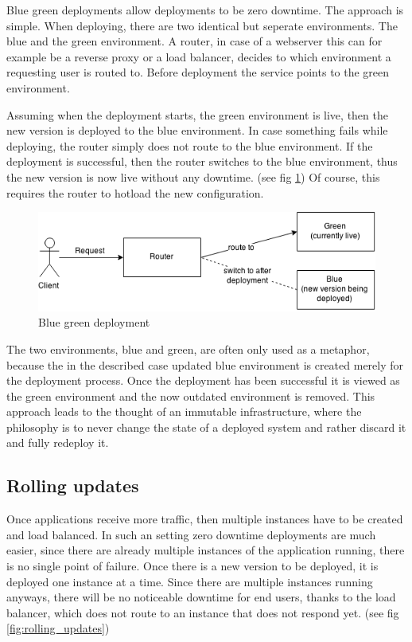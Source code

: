 Blue green deployments allow deployments to be zero downtime. The approach is
simple. When deploying, there are two identical but seperate environments. The
blue and the green environment. A router, in case of a webserver this can for
example be a reverse proxy or a load balancer, decides to which environment a
requesting user is routed to. Before deployment the service points to the green
environment.

Assuming when the deployment starts, the green environment is live, then the
new version is deployed to the blue environment. In case something fails while
deploying, the router simply does not route to the blue environment. If the
deployment is successful, then the router switches to the blue environment,
thus the new version is now live without any downtime. (see fig
\ref{fig:blue_green_deployment}) Of course, this requires the router to hotload the
new configuration.

\begin{figure}
  \includegraphics[scale=0.55]{pictures/blue_green_deployment.png}
  \caption{Blue green deployment}
  \centering
  \label{fig:blue_green_deployment}
\end{figure}

The two environments, blue and green, are often only used as a metaphor,
because the in the described case updated blue environment is created merely
for the deployment process. Once the deployment has been successful it is
viewed as the green environment and the now outdated environment is removed.
This approach leads to the thought of an immutable infrastructure, where the
philosophy is to never change the state of a deployed system and rather discard
it and fully redeploy it.

\subsection{Rolling updates}

Once applications receive more traffic, then multiple instances have to be
created and load balanced. In such an setting zero downtime deployments are
much easier, since there are already multiple instances of the application
running, there is no single point of failure. Once there is a new version to be
deployed, it is deployed one instance at a time. Since there are multiple
instances running anyways, there will be no noticeable downtime for end users,
thanks to the load balancer, which does not route to an instance that does not
respond yet. (see fig \ref{fig:rolling_updates})

